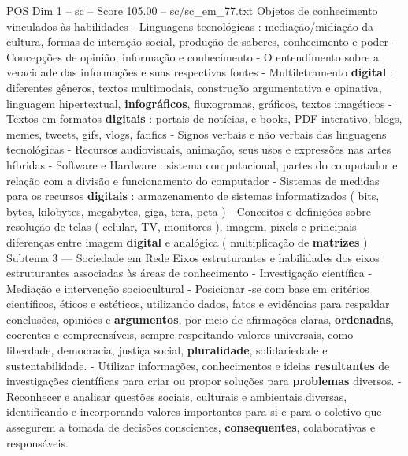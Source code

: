 \begin{textsample}{POS Dim 1 – sc – Score 105.00 – sc/sc\_em\_77.txt}
Objetos de conhecimento vinculados às habilidades - Linguagens tecnológicas : mediação/midiação da cultura, formas de interação social, produção de saberes, conhecimento e poder - Concepções de opinião, informação e conhecimento - O entendimento sobre a veracidade das informações e suas respectivas fontes - Multiletramento \textbf{digital} : diferentes gêneros, textos multimodais, construção argumentativa e opinativa, linguagem hipertextual, \textbf{infográficos}, fluxogramas, gráficos, textos imagéticos - Textos em formatos \textbf{digitais} : portais de notícias, e-books, PDF interativo, blogs, memes, tweets, gifs, vlogs, fanfics - Signos verbais e não verbais das linguagens tecnológicas - Recursos audiovisuais, animação, seus usos e expressões nas artes híbridas - Software e Hardware : sistema computacional, partes do computador e relação com a divisão e funcionamento do computador - Sistemas de medidas para os recursos \textbf{digitais} : armazenamento de sistemas informatizados ( bits, bytes, kilobytes, megabytes, giga, tera, peta ) - Conceitos e definições sobre resolução de telas ( celular, TV, monitores ), imagem, pixels e principais diferenças entre imagem \textbf{digital} e analógica ( multiplicação de \textbf{matrizes} ) Subtema 3 — Sociedade em Rede Eixos estruturantes e habilidades dos eixos estruturantes associadas às áreas de conhecimento - Investigação científica - Mediação e intervenção sociocultural - Posicionar -se com base em critérios científicos, éticos e estéticos, utilizando dados, fatos e evidências para respaldar conclusões, opiniões e \textbf{argumentos}, por meio de afirmações claras, \textbf{ordenadas}, coerentes e compreensíveis, sempre respeitando valores universais, como liberdade, democracia, justiça social, \textbf{pluralidade}, solidariedade e sustentabilidade. - Utilizar informações, conhecimentos e ideias \textbf{resultantes} de investigações científicas para criar ou propor soluções para \textbf{problemas} diversos. - Reconhecer e analisar questões sociais, culturais e ambientais diversas, identificando e incorporando valores importantes para si e para o coletivo que assegurem a tomada de decisões conscientes, \textbf{consequentes}, colaborativas e responsáveis.

\end{textsample}
